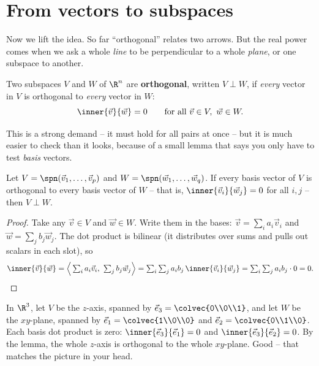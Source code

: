\section{From vectors to subspaces}

Now we lift the idea. So far ``orthogonal'' relates two arrows. But the real power comes when we
ask a whole \emph{line} to be perpendicular to a whole \emph{plane}, or one subspace to another.

\begin{definition}\label{ch17:def-orthogonal-subspaces}
Two subspaces $V$ and $W$ of $\R^n$ are \textbf{orthogonal}, written $V\perp W$, if
\emph{every} vector in $V$ is orthogonal to \emph{every} vector in $W$:
\[
  \inner{\vec{v}}{\vec{w}} = 0 \qquad \text{for all } \vec{v}\in V,\ \vec{w}\in W.
\]
\end{definition}

This is a strong demand -- it must hold for all pairs at once -- but it is much easier to check
than it looks, because of a small lemma that says you only have to test \emph{basis} vectors.

\begin{lemma}\label{ch17:basis-suffices}
Let $V=\spn(\vec{v}_1,\dots,\vec{v}_p)$ and $W=\spn(\vec{w}_1,\dots,\vec{w}_q)$. If every basis
vector of $V$ is orthogonal to every basis vector of $W$ -- that is, $\inner{\vec{v}_i}{\vec{w}_j}=0$
for all $i,j$ -- then $V\perp W$.
\end{lemma}

\begin{proof}
Take any $\vec{v}\in V$ and $\vec{w}\in W$. Write them in the bases: $\vec{v}=\sum_i a_i\vec{v}_i$
and $\vec{w}=\sum_j b_j\vec{w}_j$. The dot product is bilinear (it distributes over sums and pulls
out scalars in each slot), so
\[
  \inner{\vec{v}}{\vec{w}}
  = \Big\langle \textstyle\sum_i a_i\vec{v}_i,\ \sum_j b_j\vec{w}_j\Big\rangle
  = \sum_i\sum_j a_i b_j \,\inner{\vec{v}_i}{\vec{w}_j}
  = \sum_i\sum_j a_i b_j \cdot 0 = 0. \qedhere
\]
\end{proof}

\begin{example}\label{ch17:line-perp-plane}
In $\R^3$, let $V$ be the $z$-axis, spanned by $\vec{e}_3=\colvec{0\\0\\1}$, and let $W$ be the
$xy$-plane, spanned by $\vec{e}_1=\colvec{1\\0\\0}$ and $\vec{e}_2=\colvec{0\\1\\0}$. Each basis
dot product is zero: $\inner{\vec{e}_3}{\vec{e}_1}=0$ and $\inner{\vec{e}_3}{\vec{e}_2}=0$. By the
lemma, the whole $z$-axis is orthogonal to the whole $xy$-plane. Good -- that matches the picture
in your head.
\end{example}

